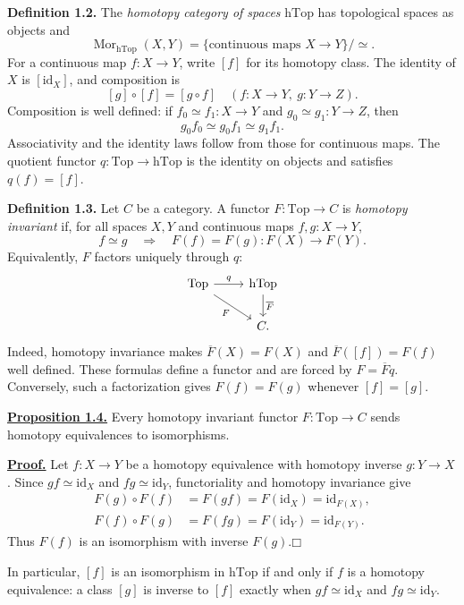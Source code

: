 \documentclass[11pt]{article}
\begin{document}
\hypertarget{def:htop}{}\textbf{Definition 1.2.} The \emph{homotopy category of spaces} $\mathrm{hTop}$ has topological spaces as objects and
\[
\operatorname{Mor}_{\mathrm{hTop}}(X,Y)
=\{\text{continuous maps }X\to Y\}/\simeq.
\]
For a continuous map $f:X\to Y$, write $[f]$ for its homotopy class. The identity of $X$ is $[\mathrm{id}_X]$, and composition is
\[
[g]\circ[f]=[g\circ f]
\quad(f:X\to Y,\ g:Y\to Z).
\]
Composition is well defined: if $f_0\simeq f_1:X\to Y$ and $g_0\simeq g_1:Y\to Z$, then
\[
g_0f_0\simeq g_0f_1\simeq g_1f_1.
\]
Associativity and the identity laws follow from those for continuous maps. The quotient functor $q:\mathrm{Top}\to\mathrm{hTop}$ is the identity on objects and satisfies $q(f)=[f]$.

\hypertarget{def:homotopy-invariant}{}\textbf{Definition 1.3.} Let $C$ be a category. A functor $F:\mathrm{Top}\to C$ is \emph{homotopy invariant} if, for all spaces $X,Y$ and continuous maps $f,g:X\to Y$,
\[
f\simeq g\quad\Longrightarrow\quad F(f)=F(g):F(X)\longrightarrow F(Y).
\]
Equivalently, $F$ factors uniquely through $q$:
\[
\begin{tikzcd}
\mathrm{Top}\arrow[r,"q"]\arrow[dr,"F"']&\mathrm{hTop}\arrow[d,"\overline F"]\\
&C.
\end{tikzcd}
\]
Indeed, homotopy invariance makes $\overline F(X)=F(X)$ and $\overline F([f])=F(f)$ well defined. These formulas define a functor and are forced by $F=\overline Fq$. Conversely, such a factorization gives $F(f)=F(g)$ whenever $[f]=[g]$.

\hypertarget{prop:homotopy-invariant}{}\textbf{\hyperlink{proof:homotopy-invariant}{Proposition 1.4.}} Every homotopy invariant functor $F:\mathrm{Top}\to C$ sends homotopy equivalences to isomorphisms.

\hypertarget{proof:homotopy-invariant}{}\textbf{\hyperlink{prop:homotopy-invariant}{Proof.}} Let $f:X\to Y$ be a homotopy equivalence with homotopy inverse $g:Y\to X$. Since $gf\simeq\mathrm{id}_X$ and $fg\simeq\mathrm{id}_Y$, functoriality and homotopy invariance give
\[
\begin{aligned}
F(g)\circ F(f)&=F(gf)=F(\mathrm{id}_X)=\mathrm{id}_{F(X)},\\
F(f)\circ F(g)&=F(fg)=F(\mathrm{id}_Y)=\mathrm{id}_{F(Y)}.
\end{aligned}
\]
Thus $F(f)$ is an isomorphism with inverse $F(g)$.\hfill$\mdlgwhtsquare$

In particular, $[f]$ is an isomorphism in $\mathrm{hTop}$ if and only if $f$ is a homotopy equivalence: a class $[g]$ is inverse to $[f]$ exactly when $gf\simeq\mathrm{id}_X$ and $fg\simeq\mathrm{id}_Y$.
\end{document}
